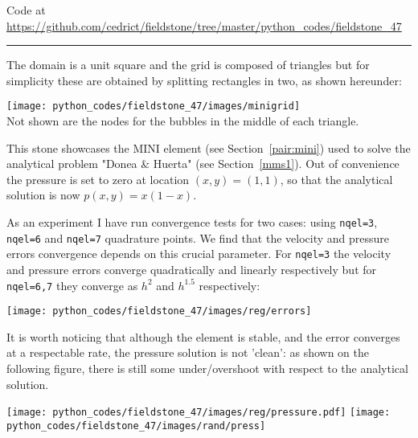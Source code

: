 

\begin{center}
Code at \url{https://github.com/cedrict/fieldstone/tree/master/python_codes/fieldstone_47}
\end{center}

\par\noindent\rule{\textwidth}{0.4pt}

The domain is a unit square and the grid is composed of triangles but for simplicity these 
are obtained by splitting rectangles in two, as shown hereunder:

\begin{center}
\texttt{[image: python\_codes/fieldstone\_47/images/minigrid]}\\
Not shown are the nodes for the bubbles in the middle of each triangle. 
\end{center}

This stone showcases the MINI element (see Section~\ref{pair:mini})
used to solve the analytical problem "Donea \& Huerta" (see Section~\ref{mms1}).
Out of convenience the pressure is set to zero at location $(x,y)=(1,1)$, so that the 
analytical solution is now $p(x,y)=x(1-x)$. 

As an experiment I have run convergence tests for two cases: using {\tt nqel=3},  
{\tt nqel=6} and {\tt nqel=7} quadrature points.
We find that the velocity and pressure errors convergence depends on this crucial parameter. 
For {\tt nqel=3} the velocity and pressure errors converge quadratically and linearly respectively
but for {\tt nqel=6,7} they converge as $h^2$ and $h^{1.5}$ respectively:

\begin{center}
\texttt{[image: python\_codes/fieldstone\_47/images/reg/errors]}
\end{center}

It is worth noticing that although the element is stable, and the error converges
at a respectable rate, the pressure solution is not 'clean': as shown on the 
following figure, there is still some under/overshoot with respect to the analytical solution.

\begin{center}
\texttt{[image: python\_codes/fieldstone\_47/images/reg/pressure.pdf]}
\texttt{[image: python\_codes/fieldstone\_47/images/rand/press]}
\end{center}

